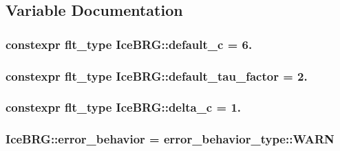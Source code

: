 \subsection{Variable Documentation}
\hypertarget{namespaceIceBRG_abcd07f4d78fce67e4c2d0a7929722725}{}
\subsubsection[{default\+\_\+c}]{\setlength{\rightskip}{0pt plus 5cm}constexpr {\bf flt\+\_\+type} Ice\+B\+R\+G\+::default\+\_\+c = 6.}\label{namespaceIceBRG_abcd07f4d78fce67e4c2d0a7929722725}
\hypertarget{namespaceIceBRG_a0676bacdb07e422cde03208f56210270}{}
\subsubsection[{default\+\_\+tau\+\_\+factor}]{\setlength{\rightskip}{0pt plus 5cm}constexpr {\bf flt\+\_\+type} Ice\+B\+R\+G\+::default\+\_\+tau\+\_\+factor = 2.}\label{namespaceIceBRG_a0676bacdb07e422cde03208f56210270}
\hypertarget{namespaceIceBRG_a7ec2b20e0b731b6392e5779857559ba2}{}
\subsubsection[{delta\+\_\+c}]{\setlength{\rightskip}{0pt plus 5cm}constexpr {\bf flt\+\_\+type} Ice\+B\+R\+G\+::delta\+\_\+c = 1.}\label{namespaceIceBRG_a7ec2b20e0b731b6392e5779857559ba2}
\hypertarget{namespaceIceBRG_a7c664338d0bd76bc09ed343d7478e65f}{}
\subsubsection[{error\+\_\+behavior}]{ Ice\+B\+R\+G\+::error\+\_\+behavior = {\bf error\+\_\+behavior\+\_\+type\+::\+W\+A\+R\+N}}\label{namespaceIceBRG_a7c664338d0bd76bc09ed343d7478e65f}
\hypertarget{namespaceIceBRG_ae34ca33d4c7073fde8efcc53cf6fd5f4}{}

